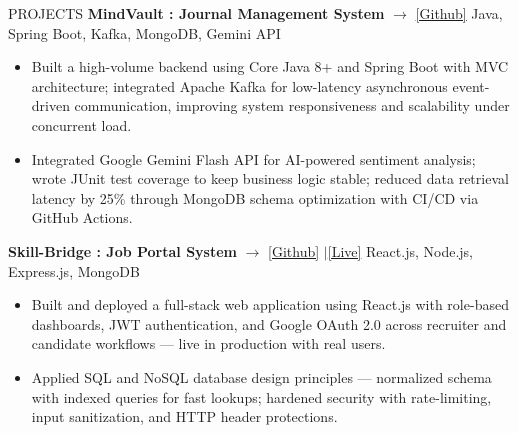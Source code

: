 \documentclass{resume}
\begin{document}
\begin{rSection}{PROJECTS}
\vspace{-2pt}
\textbf{MindVault : Journal Management System} $\rightarrow$
\href{https://github.com/Chinmay0608/MindVault}{[Github]}
\hfill {Java, Spring Boot, Kafka, MongoDB, Gemini API}
\begin{itemize}[leftmargin=*, itemsep=-3pt, topsep=0pt]
\item Built a high-volume backend using Core Java 8+ and Spring Boot with MVC architecture;
integrated Apache Kafka for low-latency asynchronous event-driven communication, improving
system responsiveness and scalability under concurrent load.
\item Integrated Google Gemini Flash API for AI-powered sentiment analysis; wrote JUnit test
coverage to keep business logic stable; reduced data retrieval latency by 25\% through
MongoDB schema optimization with CI/CD via GitHub Actions.
\end{itemize}
\vspace{2pt}
\textbf{Skill-Bridge : Job Portal System} $\rightarrow$
\href{https://github.com/Chinmay0608/job-portal-system}{[Github]}
$|$\hspace{5pt}\href{https://job-portal-system-alpha.vercel.app/}{[Live]}
\hfill {React.js, Node.js, Express.js, MongoDB}
\begin{itemize}[leftmargin=*, itemsep=-3pt, topsep=0pt]
\item Built and deployed a full-stack web application using React.js with role-based dashboards,
JWT authentication, and Google OAuth 2.0 across recruiter and candidate workflows — live in
production with real users.
\item Applied SQL and NoSQL database design principles — normalized schema with indexed queries
for fast lookups; hardened security with rate-limiting, input sanitization, and HTTP header
protections.
\end{itemize}
\vspace{-4pt}
\end{rSection}
\end{document}
